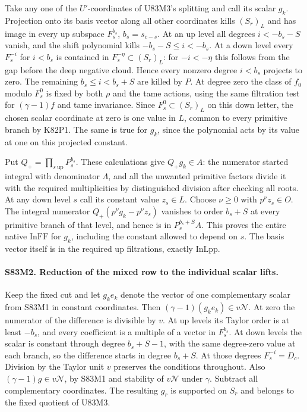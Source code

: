 Take any one of the $U'$-coordinates of U83M3's splitting and call
its scalar $g_k$. Projection onto its basis vector along all other
coordinates kills $(S_r)_L$ and has image in every up subspace
$F_s^{b_s}$, $b_s=s_{c-s}$. At an up level all degrees $i<-b_s-S$
vanish, and the shift polynomial kills $-b_s-S\le i<-b_s$.
At a down level every $F_s^{-i}$ for $i<b_s$ is contained in
$F_s^{-\eta}\subset(S_r)_L$: for $-i<-\eta$ this follows from
the gap before the deep negative cloud. Hence every nonzero degree
$i<b_s$ projects to zero. The remaining $b_s\le i<b_s+S$ are
killed by $P$. At degree zero the class of $f_0$ modulo $F_s^0$
is fixed by both $\rho$ and the tame actions, using the same
filtration test for $(\gamma-1)f$ and tame invariance. Since
$F_s^0\subset(S_r)_L$ on this down letter, the chosen scalar
coordinate at zero is one value in $L$, common to every primitive
branch by K82P1. The same is true for $g_k$, since the polynomial
acts by its value at one on this projected constant.

Put $Q_+=\prod_{s\ \mathrm{up}}P_s^{b_s}$. These calculations give
$Q_+g_k\in A$: the numerator started integral with denominator
$\Lambda$, and all the unwanted primitive factors divide it with
the required multiplicities by distinguished division after
checking all roots. At any down level $s$ call its constant value
$z_s\in L$. Choose $\nu\ge0$ with $p^\nu z_s\in O$. The integral
numerator $Q_+(p^\nu g_k-p^\nu z_s)$ vanishes to order
$b_s+S$ at every primitive branch of that level, and hence is in
$P_s^{b_s+S} A$. This proves the entire native $\mathrm{InFF}$
for $g_k$, including the constant allowed to depend on $s$.
The basis vector itself is in the required up filtrations, exactly
$\mathrm{InLpp}$.

\paragraph{S83M2. Reduction of the mixed row to the individual scalar lifts.}
Keep the fixed cut and let $g_k e_k$ denote the vector of one
complementary scalar from S83M1 in constant coordinates. Then
$(\gamma-1)(g_k e_k)\in v\mathcal N$. At zero the numerator
of the difference is divisible by $v$. At up levels its Taylor
order is at least $-b_s$, and every coefficient is a multiple of
a vector in $F_s^{b_s}$. At down levels the scalar is constant
through degree $b_s+S-1$, with the same degree-zero value at
each branch, so the difference starts in degree $b_s+S$. At
those degrees $F_s^{-i}=D_c$. Division by the Taylor unit $v$
preserves the conditions throughout. Also $(\gamma-1)g\in
v\mathcal N$, by S83M1 and stability of $v\mathcal N$ under
$\gamma$. Subtract all complementary coordinates. The resulting
$g_r$ is supported on $S_r$ and belongs to the fixed quotient
of U83M3.

